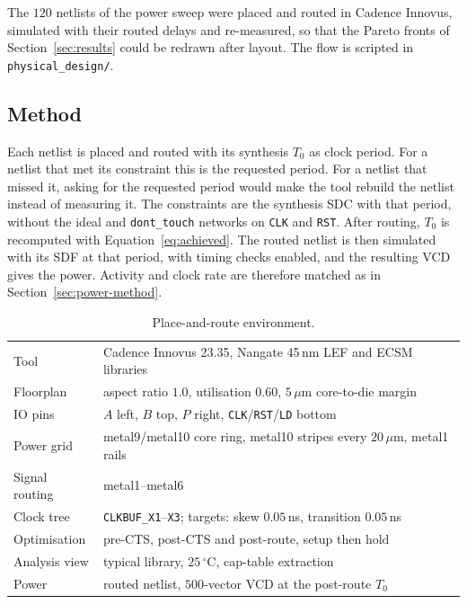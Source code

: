 \documentclass[11pt,a4paper]{article}
\begin{document}
The $120$ netlists of the power sweep were placed and routed in Cadence
Innovus, simulated with their routed delays and re-measured, so that the
Pareto fronts of Section~\ref{sec:results} could be redrawn after layout. The
flow is scripted in \texttt{physical\_design/}.

\subsection{Method}

Each netlist is placed and routed with its synthesis $T_0$ as clock period.
For a netlist that met its constraint this is the requested period. For a
netlist that missed it, asking for the requested period would make the tool
rebuild the netlist instead of measuring it. The constraints are the synthesis
SDC with that period, without the ideal and \texttt{dont\_touch} networks on
\texttt{CLK} and \texttt{RST}. After routing, $T_0$ is recomputed with
Equation~\ref{eq:achieved}. The routed netlist is then simulated with its SDF
at that period, with timing checks enabled, and the resulting VCD gives the
power. Activity and clock rate are therefore matched as in
Section~\ref{sec:power-method}.

\begin{table}[!ht]
\centering\small
\begin{tabular}{@{}ll@{}}
\toprule
Tool               & Cadence Innovus 23.35, Nangate 45\,nm LEF and ECSM libraries \\
Floorplan          & aspect ratio $1.0$, utilisation $0.60$, $5\,\mu$m core-to-die margin \\
IO pins            & $A$ left, $B$ top, $P$ right, \texttt{CLK}/\texttt{RST}/\texttt{LD} bottom \\
Power grid         & metal9/metal10 core ring, metal10 stripes every $20\,\mu$m, metal1 rails \\
Signal routing     & metal1--metal6 \\
Clock tree         & \texttt{CLKBUF\_X1}--\texttt{X3}; targets: skew $0.05$\,ns, transition $0.05$\,ns \\
Optimisation       & pre-CTS, post-CTS and post-route, setup then hold \\
Analysis view      & typical library, $25\,^{\circ}$C, cap-table extraction \\
Power              & routed netlist, $500$-vector VCD at the post-route $T_0$ \\
\bottomrule
\end{tabular}
\caption{Place-and-route environment.}
\label{tab:pd-env}
\end{table}
\end{document}
